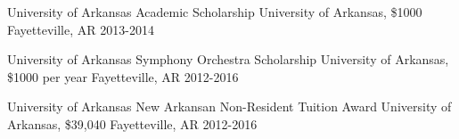 \begin{cvhonors}
    \cvhonor
    {University of Arkansas Academic Scholarship} %
    {University of Arkansas, \$1000} %
    {Fayetteville, AR} %
    {2013-2014} %

   \cvhonor
    {University of Arkansas Symphony Orchestra Scholarship} %
    {University of Arkansas, \$1000 per year} %
    {Fayetteville, AR} %
    {2012-2016} %

  \cvhonor
    {University of Arkansas New Arkansan Non-Resident Tuition Award} %
    {University of Arkansas, \$39,040} %
    {Fayetteville, AR} %
    {2012-2016} %

\end{cvhonors}



